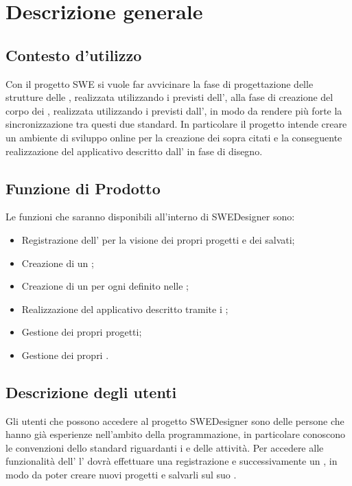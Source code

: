 \section{Descrizione generale}
\subsection{Contesto d'utilizzo}
Con il progetto SWE si vuole far avvicinare la fase di progettazione delle strutture delle , realizzata utilizzando i  previsti dell', alla fase di creazione del corpo dei , realizzata utilizzando i  previsti dall', in modo da  rendere più forte la sincronizzazione tra questi due standard. In particolare il progetto intende creare un ambiente di sviluppo online per la creazione dei  sopra citati e la conseguente realizzazione del  applicativo descritto dall' in fase di disegno.
 
\subsection{Funzione di Prodotto}
Le funzioni che saranno disponibili all'interno di SWEDesigner sono:
\begin{itemize}
\item Registrazione dell' per la visione dei propri progetti e dei  salvati; 
\item Creazione di un ; 
\item Creazione di un  per ogni  definito nelle ;
\item Realizzazione del  applicativo descritto tramite i ;
\item Gestione dei propri progetti;
\item Gestione dei propri .
\end{itemize}

\subsection{Descrizione degli utenti}
Gli utenti che possono accedere al progetto SWEDesigner sono delle persone che hanno già esperienze nell'ambito della programmazione, in particolare conoscono le convenzioni dello standard  riguardanti i  e delle attività. 
Per accedere alle funzionalità dell' l' dovrà effettuare una registrazione e successivamente un , in modo da poter creare nuovi progetti e salvarli sul suo .